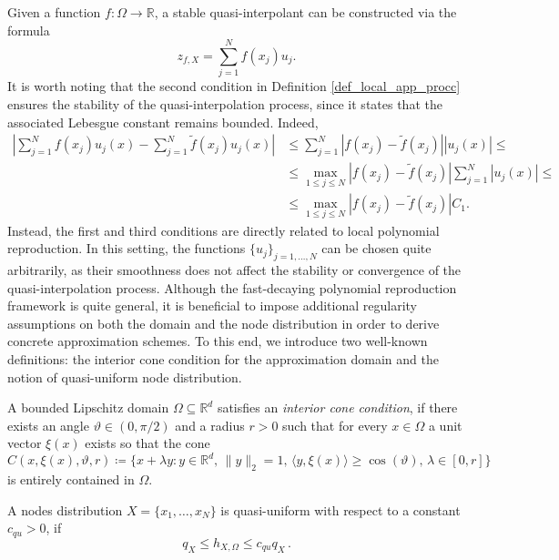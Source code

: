 \documentclass{drna}
\begin{document}
\vskip 0.1in
\noindent Given a function $f: \Omega \rightarrow \mathbb{R}$, a stable quasi-interpolant can be constructed via the formula
\begin{equation}
    z_{f,X} = \sum_{j=1}^{N} f(x_j)u_j.
    \label{eq_pol_rep_quasi_interpolant}
\end{equation}
\noindent It is worth noting that the second condition in Definition \ref{def_local_app_procc} ensures the stability of the quasi-interpolation process, since it states that the associated Lebesgue constant remains bounded. Indeed,
\begin{equation*}
	\begin{split}
		 \left|\sum_{j=1}^N f(x_j)u_j(x)-\sum_{j=1}^N \widetilde{f}(x_j)u_j(x)\right| & \leq \sum_{j=1}^N |f(x_j)-\widetilde{f}(x_j)||u_j(x)| \leq \\
		 & \leq \max_{1 \leq j \leq N} |f(x_j)-\widetilde{f}(x_j)| \sum_{j=1}^N |u_j(x)| \leq \\
		 & \leq \max_{1 \leq j \leq N} |f(x_j)-\widetilde{f}(x_j)| C_1.
	\end{split}
\end{equation*}
Instead, the first and third conditions are directly related to local polynomial reproduction. In this setting, the functions $\{u_j\}_{j=1,\dots,N}$ can be chosen quite arbitrarily, as their smoothness does not affect the stability or convergence of the quasi-interpolation process. Although the fast-decaying polynomial reproduction framework is quite general, it is beneficial to impose additional regularity assumptions on both the domain and the node distribution in order to derive concrete approximation schemes. To this end, we introduce two well-known definitions: the interior cone condition for the approximation domain and the notion of quasi-uniform node distribution.
\begin{definition}
A bounded Lipschitz domain $\Omega \subseteq \mathbb{R}^d$  satisfies an {\it interior cone condition}, if there exists an angle $\vartheta \in (0,\pi/2)$ and a radius $r>0$ such that for every $x \in \Omega$ a unit vector $\xi(x)$ exists so that the cone
	\begin{equation*}
		C(x,\xi(x),\vartheta,r) \coloneqq \{ x+ \lambda y : y \in \mathbb{R}^d,\, \|y\|_2 = 1, \, \langle y, \xi(x) \rangle \geq \cos (\vartheta), \, \lambda \in [0,r] \}
	\end{equation*}
 is entirely contained in $\Omega$. 
\end{definition}
\begin{definition}\label{def_quasi_uniform_data_set}
A nodes distribution $X=\{x_1,\dots,x_N\}$ is quasi-uniform with respect to a constant $c_{qu}>0$, if
\begin{equation*}
        q_{X} \leq h_{X,\Omega} \leq c_{qu} q_{X}\,.
\end{equation*}
\end{definition}
\end{document}
